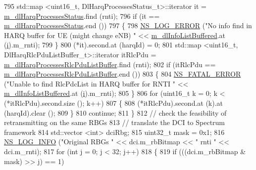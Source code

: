 \begin{DoxyCode}
795               std::map <uint16\_t, DlHarqProcessesStatus\_t>::iterator it = 
      \hyperlink{classns3_1_1RrFfMacScheduler_aa3d12b5abcb9afeea093150a6572aaed}{m\_dlHarqProcessesStatus}.find (rnti);
796               \textcolor{keywordflow}{if} (it == \hyperlink{classns3_1_1RrFfMacScheduler_aa3d12b5abcb9afeea093150a6572aaed}{m\_dlHarqProcessesStatus}.end ())
797                 \{
798                   \hyperlink{group__logging_ga0261a8db1d4ac5f79417d117634fd455}{NS\_LOG\_ERROR} (\textcolor{stringliteral}{"No info find in HARQ buffer for UE (might change eNB) "} << 
      \hyperlink{classns3_1_1RrFfMacScheduler_a4176ffb0eba681a3e3b5be0be1a30771}{m\_dlInfoListBuffered}.at (\hyperlink{bernuolliDistribution_8m_a6f6ccfcf58b31cb6412107d9d5281426}{i}).m\_rnti);
799                 \}
800               (*it).second.at (harqId) = 0;
801               std::map <uint16\_t, DlHarqRlcPduListBuffer\_t>::iterator itRlcPdu =  
      \hyperlink{classns3_1_1RrFfMacScheduler_a2a6afd0a7df7a71c20382176f6cc9573}{m\_dlHarqProcessesRlcPduListBuffer}.find (rnti);
802               \textcolor{keywordflow}{if} (itRlcPdu == \hyperlink{classns3_1_1RrFfMacScheduler_a2a6afd0a7df7a71c20382176f6cc9573}{m\_dlHarqProcessesRlcPduListBuffer}.end ())
803                 \{
804                   \hyperlink{group__fatal_ga5131d5e3f75d7d4cbfd706ac456fdc85}{NS\_FATAL\_ERROR} (\textcolor{stringliteral}{"Unable to find RlcPdcList in HARQ buffer for RNTI "} << 
      \hyperlink{classns3_1_1RrFfMacScheduler_a4176ffb0eba681a3e3b5be0be1a30771}{m\_dlInfoListBuffered}.at (\hyperlink{bernuolliDistribution_8m_a6f6ccfcf58b31cb6412107d9d5281426}{i}).m\_rnti);
805                 \}
806               \textcolor{keywordflow}{for} (uint16\_t k = 0; k < (*itRlcPdu).second.size (); k++)
807                 \{
808                   (*itRlcPdu).second.at (k).at (harqId).clear ();
809                 \}
810               \textcolor{keywordflow}{continue};
811             \}
812           \textcolor{comment}{// check the feasibility of retransmitting on the same RBGs}
813           \textcolor{comment}{// translate the DCI to Spectrum framework}
814           std::vector <int> dciRbg;
815           uint32\_t mask = 0x1;
816           \hyperlink{group__logging_gafbd73ee2cf9f26b319f49086d8e860fb}{NS\_LOG\_INFO} (\textcolor{stringliteral}{"Original RBGs "} << dci.m\_rbBitmap << \textcolor{stringliteral}{" rnti "} << dci.m\_rnti);
817           \textcolor{keywordflow}{for} (\textcolor{keywordtype}{int} j = 0; j < 32; j++)
818             \{
819               \textcolor{keywordflow}{if} (((dci.m\_rbBitmap & mask) >> j) == 1)

\end{DoxyCode}
